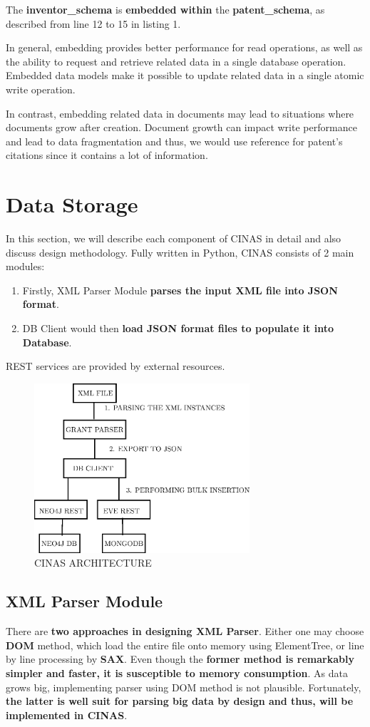 \documentclass{article}
\begin{document}
The \textbf{inventor\_schema} is \textbf{embedded within} the \textbf{patent\_schema}, as described from line 12 to 15 in listing 1.\par
In general, embedding provides better performance for read operations, as well as the ability to request and retrieve related data in a single database operation. Embedded data models make it possible to update related data in a single atomic write operation.\par
In contrast, embedding related data in documents may lead to situations where documents grow after creation. Document growth can impact write performance and lead to data fragmentation and thus, we would use reference for patent's citations since it contains a lot of information.


\section{Data Storage}
In this section, we will describe each component of CINAS in detail and also discuss design methodology. Fully written in Python, CINAS consists of 2 main modules:
\begin{enumerate}
 \item Firstly, XML Parser Module \textbf{parses the input XML file into JSON format}.
 \item DB Client would then \textbf{load JSON format files to populate it into Database}.
\end{enumerate}
REST services are provided by external resources.
\begin{figure}[H]
\centering
\includegraphics[width=80mm,scale=0.1]{cinasstruct.eps}
\caption{ CINAS ARCHITECTURE}
\end{figure}
\subsection{XML Parser Module}
There are \textbf{two approaches in designing XML Parser}. Either one may choose \textbf{DOM} method, which load the entire file onto memory using ElementTree, or line by line processing by \textbf{SAX}. Even though the \textbf{former method is remarkably simpler and faster, it is susceptible to memory consumption}. As data grows big, implementing parser using DOM method is not plausible. Fortunately, \textbf{the latter is well suit for parsing big data by design and thus, will be implemented in CINAS}.
\end{document}
